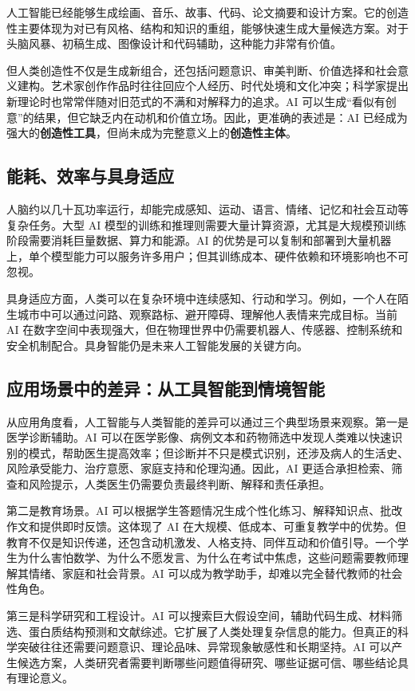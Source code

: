 \documentclass[UTF8,zihao=-4,a4paper]{ctexart}
\begin{document}
人工智能已经能够生成绘画、音乐、故事、代码、论文摘要和设计方案。它的创造性主要体现为对已有风格、结构和知识的重组，能够快速生成大量候选方案。对于头脑风暴、初稿生成、图像设计和代码辅助，这种能力非常有价值。

但人类创造性不仅是生成新组合，还包括问题意识、审美判断、价值选择和社会意义建构。艺术家创作作品时往往回应个人经历、时代处境和文化冲突；科学家提出新理论时也常常伴随对旧范式的不满和对解释力的追求。AI 可以生成“看似有创意”的结果，但它缺乏内在动机和价值立场。因此，更准确的表述是：AI 已经成为强大的\textbf{创造性工具}，但尚未成为完整意义上的\textbf{创造性主体}。

\subsection{能耗、效率与具身适应}

人脑约以几十瓦功率运行，却能完成感知、运动、语言、情绪、记忆和社会互动等复杂任务。大型 AI 模型的训练和推理则需要大量计算资源，尤其是大规模预训练阶段需要消耗巨量数据、算力和能源。AI 的优势是可以复制和部署到大量机器上，单个模型能力可以服务许多用户；但其训练成本、硬件依赖和环境影响也不可忽视。

具身适应方面，人类可以在复杂环境中连续感知、行动和学习。例如，一个人在陌生城市中可以通过问路、观察路标、避开障碍、理解他人表情来完成目标。当前 AI 在数字空间中表现强大，但在物理世界中仍需要机器人、传感器、控制系统和安全机制配合。具身智能仍是未来人工智能发展的关键方向。

\subsection{应用场景中的差异：从工具智能到情境智能}

从应用角度看，人工智能与人类智能的差异可以通过三个典型场景来观察。第一是医学诊断辅助。AI 可以在医学影像、病例文本和药物筛选中发现人类难以快速识别的模式，帮助医生提高效率；但诊断并不只是模式识别，还涉及病人的生活史、风险承受能力、治疗意愿、家庭支持和伦理沟通。因此，AI 更适合承担检索、筛查和风险提示，人类医生仍需要负责最终判断、解释和责任承担。

第二是教育场景。AI 可以根据学生答题情况生成个性化练习、解释知识点、批改作文和提供即时反馈。这体现了 AI 在大规模、低成本、可重复教学中的优势。但教育不仅是知识传递，还包含动机激发、人格支持、同伴互动和价值引导。一个学生为什么害怕数学、为什么不愿发言、为什么在考试中焦虑，这些问题需要教师理解其情绪、家庭和社会背景。AI 可以成为教学助手，却难以完全替代教师的社会性角色。

第三是科学研究和工程设计。AI 可以搜索巨大假设空间，辅助代码生成、材料筛选、蛋白质结构预测和文献综述。它扩展了人类处理复杂信息的能力。但真正的科学突破往往还需要问题意识、理论品味、异常现象敏感性和长期坚持。AI 可以产生候选方案，人类研究者需要判断哪些问题值得研究、哪些证据可信、哪些结论具有理论意义。
\end{document}
